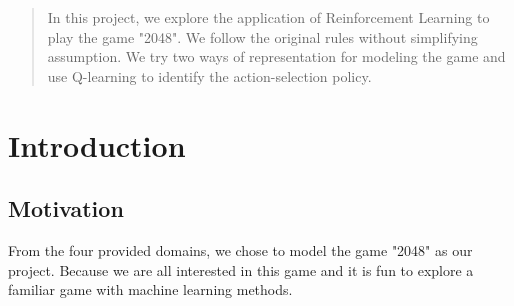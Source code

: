 \begin{abstract}
    In this project, we explore the application of Reinforcement Learning to play the game "2048". We follow the original rules without simplifying assumption. We try two ways of representation for modeling the game and use Q-learning to identify the action-selection policy.
\end{abstract}
\section{Introduction}
\subsection{Motivation}
From the four provided domains, we chose to model the game "2048" as our project. Because we are all interested in this game and it is fun to explore a familiar game with machine learning methods.